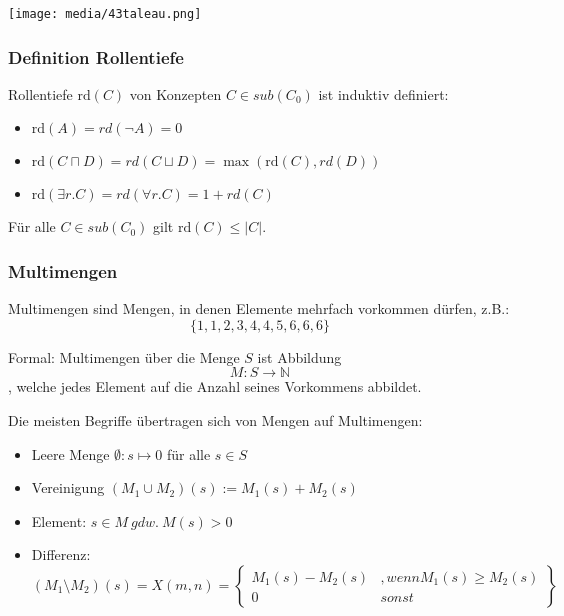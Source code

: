\texttt{[image: media/43taleau.png]}

\subsubsection{Definition Rollentiefe}\label{definition-rollentiefe}

Rollentiefe $\text{rd}\left( C \right)$ von Konzepten
$C \in sub\left( C_{0} \right)$ ist induktiv definiert:

\begin{itemize}
\item
  $\text{rd}\left( A \right) = rd\left( \neg A \right) = 0$
\item
  $\text{rd}\left( C \sqcap D \right) = rd\left( C \sqcup D \right) = \max\left( \text{rd}\left( C \right),rd\left( D \right) \right)$
\item
  $\text{rd}\left( \exists r.C \right) = rd\left( \forall r.C \right) = 1 + rd\left( C \right)$
\end{itemize}

\begin{lemma}
Für alle $C \in sub\left( C_{0} \right)$ gilt
$\text{rd}\left( C \right) \leq \left| C \right|$.
\end{lemma}

\subsubsection{Multimengen}\label{multimengen}

Multimengen sind Mengen, in denen Elemente mehrfach vorkommen dürfen, z.B.:
$$\{1,1,2,3,4,4,5,6,6,6\}$$

Formal: Multimengen über die Menge $S$ ist Abbildung $$M:S\mathbb{\rightarrow N}$$, welche jedes Element auf die Anzahl seines Vorkommens abbildet.

Die meisten Begriffe übertragen sich von Mengen auf Multimengen:

\begin{itemize}
	\item Leere Menge $\emptyset: s \mapsto 0$ für alle $s \in S$
	\item Vereinigung $(M_1 \cup M_2)(s) := M_1(s) + M_2(s)$ 
	\item Element: $s \in M\ gdw.\ M(s)>0$
	\item Differenz: $(M_1 \setminus M_2)(s) = X(m,n) = \left\{\begin{array}{lr}
        M_1(s) - M_2(s) &, wenn M_1(s) \geq M_2(s) \\
        0 & sonst
        \end{array}\right\}$
\end{itemize}

